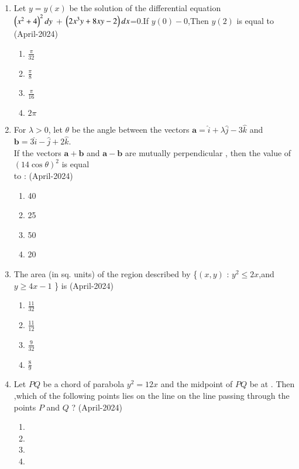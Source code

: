 \documentclass[journal,12pt,onecolumn]{IEEEtran}
\theoremstyle{remark}
\begin{document}
\begin{enumerate}
\item Let $y=y(x)$ be the solution of the differential equation \\
$\left(x^2+4\right)^2dy$ + $\left(2x^3y+8xy-2\right)dx$=0.If $y(0)-0$,Then $y(2)$ is equal to 
\hfill{(April-2024)}
\begin{multicols}{2}
\begin{enumerate}
\item $\frac{\pi}{32}$
\item $\frac{\pi}{8}$
\item $\frac{\pi}{16}$
\item $2\pi$
\end{enumerate}
\end{multicols}
\item For $\lambda > 0$, let $\theta$ be the angle between the vectors $\mathbf{a} = \hat{i} + \lambda \hat{j} - 3 \hat{k}$ and $\mathbf{b} = 3 \hat{i} - \hat{j} + 2 \hat{k}$. \\
If the vectors $\mathbf{a} + \mathbf{b}$ and $\mathbf{a} - \mathbf{b}$ are mutually perpendicular , then the value of $(14\cos{\theta})^2$ is equal \\to :     
\hfill{(April-2024)}
\begin{multicols}{2}
\begin{enumerate}
\item 40
\item 25
\item 50
\item 20
\end{enumerate}
\end{multicols}
\item The area (in sq. units) of the region described by \{$(x, y)$ : $y^2 \leq 2x$,and $y \geq 4x - 1$ \} is
\hfill{(April-2024)}
\begin{multicols}{2}
\begin{enumerate}
\item $\frac{11}{32}$
\item $\frac{11}{12}$
\item $\frac{9}{32}$
\item $\frac{8}{9}$
\end{enumerate}
\end{multicols}
\item Let $PQ$ be a chord of parabola $y^2=12x$ and the midpoint of $PQ$ be at  . Then ,which of the following points lies on the line on the line passing through the points $P$ and $Q$ ?
\hfill{(April-2024)}
\begin{multicols}{2}
\begin{enumerate}
\item {}
\item {}
\item {}
\item {}
\end{enumerate}
\end{multicols}
\end{enumerate}
\end{document}
